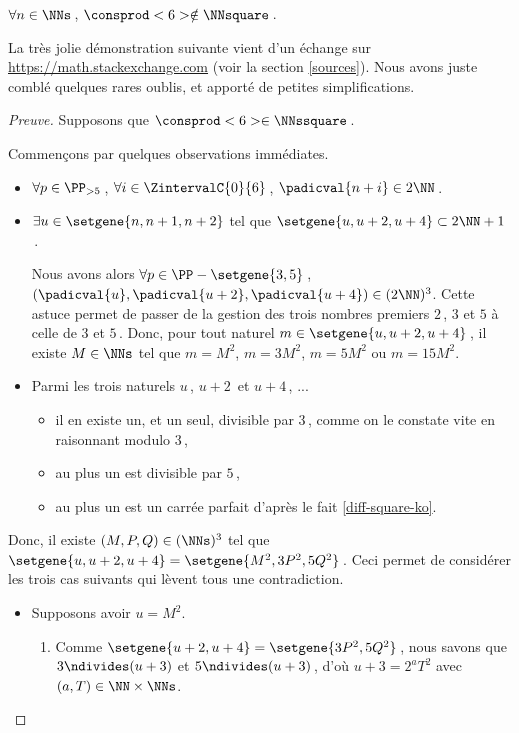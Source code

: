 \begin{fact} \label{case-7}
	 $\forall n \in \NNs$\,, $\consprod<6> \notin \NNsquare$\,.
\end{fact}




La très jolie démonstration suivante vient d'un échange sur \url{https://math.stackexchange.com} (voir la section \ref{sources}). Nous avons juste comblé quelques rares oublis, et apporté de petites simplifications.
	

\begin{proof}[Preuve]
	Supposons que $\consprod<6> \in \NNssquare$\,.
	
	\smallskip
	
	Commençons par quelques observations immédiates.
    \begin{itemize}
    	\item  
		$\forall p \in \PP_{>5}$\,, 
   		$\forall i \in \ZintervalC{0}{6}$\,, 
    	$\padicval{n + i} \in 2 \NN$\,.
	
	
		\item $\exists u \in \setgene{n, n+1, n+2}$ tel que $\setgene{u, u + 2, u + 4} \subset 2 \NN + 1$\,.
		
		\noindent
		Nous avons alors
		$\forall p \in \PP - \setgene{3, 5}$\,, 
   		$(\padicval{u}, \padicval{u+2}, \padicval{u+4}) \in ( 2 \NN )^3$.
		Cette astuce permet de passer de la gestion des trois nombres premiers $2$\,, $3$ et $5$ à celle de $3$ et $5$\,.
		Donc, pour tout naturel $m \in \setgene{u, u + 2, u + 4}$\,, 
		il existe $M \in \NNs$ tel que 
		$m = M^2$, $m = 3 M^2$, $m = 5 M^2$ ou $m = 15 M^2$.
	
	
		\item Parmi les trois naturels $u$\,, $u + 2$\, et $u + 4$\,, ...
		\begin{itemize}
    		\item il en existe un, et un seul, divisible par $3$\,, comme on le constate vite en raisonnant modulo $3$\,,

    		\item au plus un est divisible par $5$\,,

    		\item au plus un est un carrée parfait d'après le fait \ref{diff-square-ko}.
		\end{itemize}
    \end{itemize}

    \smallskip
	
	Donc, il existe $(M, P, Q) \in ( \NNs )^3$ tel que 
    $\setgene{u, u + 2, u + 4} = \setgene{M^2, 3P^2, 5Q^2}$\,.
    Ceci permet de considérer les trois cas suivants qui lèvent tous une contradiction.
    \begin{itemize}
    	\item Supposons avoir $u = M^2$.
		\begin{enumerate}
			\item Comme $\setgene{u + 2, u + 4} = \setgene{3P^2, 5Q^2}$\,, nous savons que $3 \ndivides (u + 3)$ et $5 \ndivides (u + 3)$\,, d'où $u + 3 = 2^a T^2$ avec $(a, T) \in \NN \times \NNs$.


\end{enumerate}
\end{itemize}
\end{proof}
